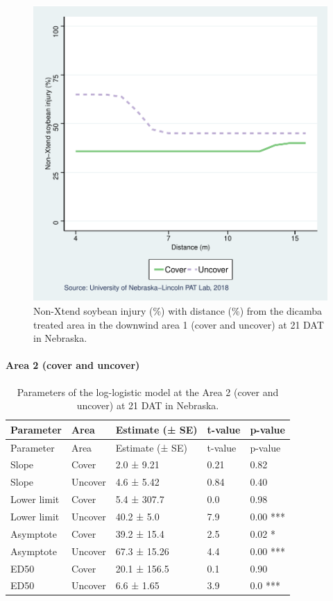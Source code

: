 \documentclass[]{article}
\let\oldparagraph\paragraph
\renewcommand{\paragraph}[1]{\oldparagraph{#1}\mbox{}}
\begin{document}
\begin{figure}
\centering
\includegraphics{Report_Dicamba_study_files/figure-latex/unnamed-chunk-68-1.pdf}
\caption{Non-Xtend soybean injury (\%) with distance (\%) from the
dicamba treated area in the downwind area 1 (cover and uncover) at 21
DAT in Nebraska.}
\end{figure}

\newpage

\paragraph{Area 2 (cover and uncover)}\label{area-2-cover-and-uncover}

\begin{longtable}[]{@{}lllll@{}}
\caption{Parameters of the log-logistic model at the Area 2 (cover and
uncover) at 21 DAT in Nebraska.}\tabularnewline
\toprule
Parameter & Area & Estimate (± SE) & t-value & p-value\tabularnewline
\midrule
\endfirsthead
\toprule
Parameter & Area & Estimate (± SE) & t-value & p-value\tabularnewline
\midrule
\endhead
Slope & Cover & 2.0 ± 9.21 & 0.21 & 0.82\tabularnewline
Slope & Uncover & 4.6 ± 5.42 & 0.84 & 0.40\tabularnewline
Lower limit & Cover & 5.4 ± 307.7 & 0.0 & 0.98\tabularnewline
Lower limit & Uncover & 40.2 ± 5.0 & 7.9 & 0.00 ***\tabularnewline
Asymptote & Cover & 39.2 ± 15.4 & 2.5 & 0.02 *\tabularnewline
Asymptote & Uncover & 67.3 ± 15.26 & 4.4 & 0.00 ***\tabularnewline
ED50 & Cover & 20.1 ± 156.5 & 0.1 & 0.90\tabularnewline
ED50 & Uncover & 6.6 ± 1.65 & 3.9 & 0.0 ***\tabularnewline
\bottomrule
\end{longtable}
\end{document}
